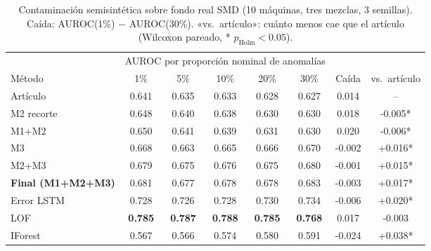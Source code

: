 \begin{table}[t]
\centering\small
\caption{Contaminación semisintética sobre fondo real SMD (10 máquinas, tres mezclas, 3 semillas). Caída: AUROC(1\%) $-$ AUROC(30\%). «vs.\ artículo»: cuánto menos cae que el artículo (Wilcoxon pareado, * $p_{\text{Holm}}<0.05$).}
\label{tab:semi}
\begin{tabular}{lccccccc}
\toprule
& \multicolumn{5}{c}{AUROC por proporción nominal de anomalías} & & \\ \cmidrule(lr){2-6}
Método & 1\% & 5\% & 10\% & 20\% & 30\% & Caída & vs.\ artículo \\
\midrule
Artículo & 0.641 & 0.635 & 0.633 & 0.628 & 0.627 & 0.014 & -- \\
M2 recorte & 0.648 & 0.640 & 0.638 & 0.630 & 0.630 & 0.018 & -0.005* \\
M1+M2 & 0.650 & 0.641 & 0.639 & 0.631 & 0.630 & 0.020 & -0.006* \\
M3 & 0.668 & 0.663 & 0.665 & 0.666 & 0.670 & -0.002 & +0.016* \\
M2+M3 & 0.679 & 0.675 & 0.676 & 0.675 & 0.680 & -0.001 & +0.015* \\
\textbf{Final (M1+M2+M3)} & 0.681 & 0.677 & 0.678 & 0.678 & 0.683 & -0.003 & +0.017* \\
Error LSTM & 0.728 & 0.726 & 0.728 & 0.730 & 0.734 & -0.006 & +0.020* \\
LOF & \textbf{0.785} & \textbf{0.787} & \textbf{0.788} & \textbf{0.785} & \textbf{0.768} & 0.017 & -0.003 \\
IForest & 0.567 & 0.566 & 0.574 & 0.580 & 0.591 & -0.024 & +0.038* \\
\bottomrule
\end{tabular}
\end{table}
